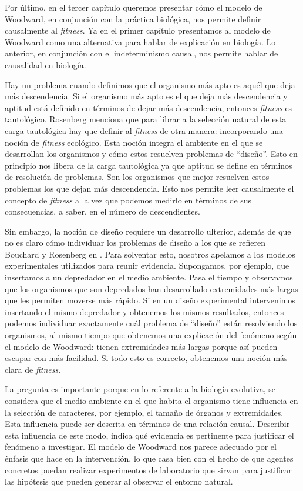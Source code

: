 Por último, en el tercer capítulo queremos presentar cómo el modelo de Woodward, en conjunción con la práctica biológica, nos permite definir causalmente al \emph{fitness}. Ya en el primer capítulo presentamos al modelo de Woodward como una alternativa para hablar de explicación en biología. Lo anterior, en conjunción con el indeterminismo causal, nos permite hablar de causalidad en biología.

Hay un problema cuando definimos que el organismo más apto es aquél que deja más descendencia. Si el organismo más apto es el que deja más descendencia y aptitud está definido en términos de dejar más descendencia, entonces \emph{fitness} es tautológico. Rosenberg menciona que para librar a la selección natural de esta carga tautológica hay que definir al \emph{fitness} de otra manera: incorporando una noción de \emph{fitness} ecológico. Esta noción integra el ambiente en el que se desarrollan los organismos y cómo estos resuelven problemas de ``diseño''. Esto en principio nos libera de la carga tautológica ya que aptitud se define en términos de resolución de problemas. Son los organismos que mejor resuelven estos problemas los que dejan más descendencia. Esto nos permite leer causalmente el concepto de \emph{fitness} a la vez que podemos medirlo en términos de sus consecuencias, a saber, en el número de descendientes.

Sin embargo, la noción de diseño requiere un desarrollo ulterior, además de que no es claro cómo individuar los problemas de diseño a los que se refieren Bouchard y Rosenberg en \citeyear{Bouchard2004}. Para solventar esto, nosotros apelamos a los modelos experimentales utilizados para reunir evidencia. Supongamos, por ejemplo, que insertamos a un depredador en el medio ambiente. Pasa el tiempo y observamos que los organismos que son depredados han desarrollado extremidades más largas que les permiten moverse más rápido. Si en un diseño experimental intervenimos insertando el mismo depredador y obtenemos los mismos resultados, entonces podemos individuar exactamente cuál problema de ``diseño'' están resolviendo los organismos, al mismo tiempo que obtenemos una explicación del fenómeno según el modelo de Woodward: tienen extremidades más largas porque así pueden escapar con más facilidad. Si todo esto es correcto, obtenemos una noción más clara de \emph{fitness}.

La pregunta es importante porque en lo referente a la biología evolutiva, se considera que el medio ambiente en el que habita el organismo tiene influencia en la selección de caracteres, por ejemplo, el tamaño de órganos y extremidades. Esta influencia puede ser descrita en términos de una relación causal. Describir esta influencia de este modo, indica qué evidencia es pertinente para justificar el fenómeno a investigar. El modelo de Woodward nos parece adecuado por el énfasis que hace en la intervención, lo que casa bien con el hecho de que agentes concretos puedan realizar experimentos de laboratorio que sirvan para justificar las hipótesis que pueden generar al observar el entorno natural.



